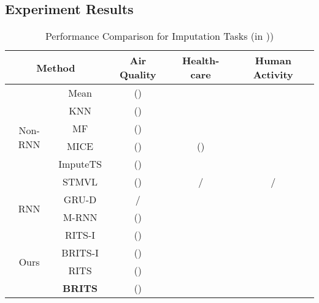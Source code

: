 \documentclass{article}
\newcommand{\ritsi}{\xspace{RITS-I}}
\newcommand{\britsi}{\xspace{BRITS-I}}
\newcommand{\rits}{\xspace{RITS}}
\newcommand{\brits}{\xspace{BRITS}}
\begin{document}
\subsection{Experiment Results}
\begin{table}[t!]
\centering
\renewcommand\arraystretch{1.2}
\caption{Performance Comparison for Imputation Tasks (in ))}
\label{tab:imputation}
\begin{tabular}{c|c|c|c|c}
\toprule[1.6pt]
\multicolumn{2}{c|}{Method}                                            & Air Quality & Health-care                           & Human Activity                        \\ \hline
\multirow{6}{*}{Non-RNN} & Mean                                         &  ()                           &                    &                     \\ \cline{2-5} 
                         & KNN                                          &  ()                           &                    &                     \\ \cline{2-5} 
                         & MF                                           &  ()                           &                     &                    \\ \cline{2-5} 
                         & MICE                                         &  ()                           &  ()                   &                     \\ \cline{2-5} 
                         & ImputeTS                                     &  ()                           &                      &                     \\ \cline{2-5} 
                         & STMVL                                        &  ()                           & /                                     & /                                     \\ \hline
\multirow{2}{*}{RNN}     & GRU-D                                        & /                                             &                     &                     \\ \cline{2-5} 
                         & M-RNN                                        &  ()                           &                     &                     \\ \hline
\multirow{4}{*}{Ours}    & \ritsi                        &  ()                           &                     &                     \\ \cline{2-5} 
                         & \britsi                       &  ()                           &                     &                     \\ \cline{2-5} 
                         & \rits                         &  ()                           &                     &                     \\ \cline{2-5} 
                         & {\bf \brits} &  ()         &   &   \\ \hline
\end{tabular}
\end{table}
\end{document}
